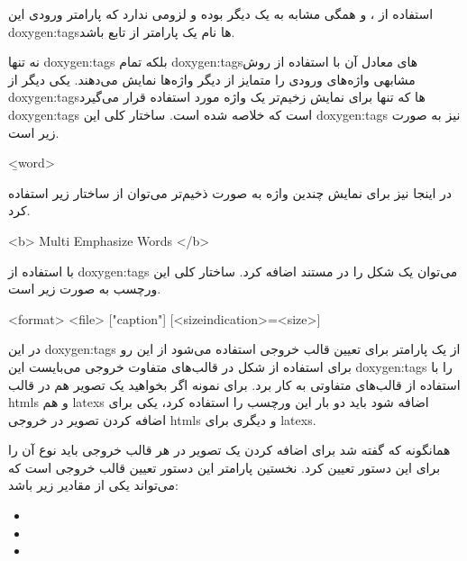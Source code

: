 \begin{note}
استفاده از ،  و  همگی مشابه به یک دیگر بوده و لزومی ندارد
که پارامتر ورودی این \glspl{doxygen:tag}‌ها نام یک پارامتر از تابع باشد.
\end{note}

نه تنها \glspl{doxygen:tag}  بلکه تمام \glspl{doxygen:tag}‌های معادل آن با استفاده از روش مشابهی
واژه‌های ورودی را متمایز از دیگر واژه‌ها نمایش می‌دهند. یکی دیگر از \glspl{doxygen:tag}‌ها که
تنها برای نمایش زخیم‌تر یک واژه مورد استفاده قرار می‌گیرد \glspl{doxygen:tag}  است که
خلاصه شده  است. ساختار کلی این \glspl{doxygen:tag} نیز به صورت زیر است.

\begin{doxygen}
\b <word>
\end{doxygen}

در اینجا نیز برای نمایش چندین واژه به صورت ذخیم‌تر می‌توان از ساختار زیر استفاده
کرد.

\begin{doxygen}
<b> Multi Emphasize Words </b>
\end{doxygen}



با استفاده از \glspl{doxygen:tag}  می‌توان یک شکل را در مستند اضافه
کرد. ساختار کلی این ورچسب به صورت زیر است.
 
\begin{doxygen}
\image <format> <file> ["caption"] [<sizeindication>=<size>]
\end{doxygen}

در این \glspl{doxygen:tag} از یک پارامتر برای تعیین قالب خروجی استفاده
می‌شود از این رو برای استفاده از شکل در قالب‌های متفاوت خروجی می‌بایست این
\glspl{doxygen:tag} را با استفاده از قالب‌های متفاوتی به کار برد. برای نمونه
اگر بخواهید یک تصویر هم در قالب \glspl{html} و هم \glspl{latex} اضافه شود باید
دو بار این ورچسب را استفاده کرد، یکی برای اضافه کردن تصویر در خروجی \glspl{html}
و دیگری برای \glspl{latex}.

همانگونه که گفته شد برای اضافه کردن یک تصویر در هر قالب خروجی باید نوع آن را
برای این دستور تعیین کرد. نخستین پارامتر این دستور تعیین قالب خروجی است که
می‌تواند یکی از مقادیر زیر باشد:

\begin{itemize}
  \item {}
  \item {}
  \item {}
\end{itemize}


